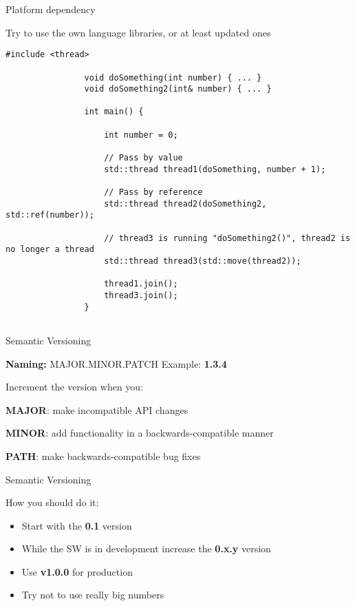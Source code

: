 \documentclass{beamer}
\newcommand{\normalSizeItem}[1] {
  \normalsize{\item #1}
}
\newcommand{\smallCite}[1]{
	\begin{small}
		\cite{#1}	
	\end{small}
}
\begin{document}
		\begin{frame}[fragile]{Platform dependency}	
			\begin{itemize}

				\normalSizeItem { Try to use the own language libraries, or at least updated ones }
				\begin{lstlisting}[basicstyle={\tiny\ttfamily}]
				#include <thread>
				
				void doSomething(int number) { ... }
				void doSomething2(int& number) { ... }
				
				int main() {
				
					int number = 0;
					
					// Pass by value
					std::thread thread1(doSomething, number + 1); 
					
					// Pass by reference
					std::thread thread2(doSomething2, std::ref(number)); 
					
					// thread3 is running "doSomething2()", thread2 is no longer a thread
					std::thread thread3(std::move(thread2)); 
					
					thread1.join();
					thread3.join();					
				}
				
				\end{lstlisting}
				
			\end{itemize}
		\end{frame}
		
		\begin{frame}[fragile]{Semantic Versioning \smallCite{semanticVersioning}}	
			
			\textbf{Naming:} MAJOR.MINOR.PATCH
			\newline\newline
			Example: \textbf{1.3.4}
		
			Increment the version when you:
			\begin{itemize}
				\normalSizeItem { \textbf{MAJOR}: make incompatible API changes}
				\normalSizeItem { \textbf{MINOR}: add functionality in a backwards-compatible manner}
				\normalSizeItem { \textbf{PATH}: make backwards-compatible bug fixes}
			\end{itemize}
		\end{frame}
		
		\begin{frame}[fragile]{Semantic Versioning}	
			
			How you should do it:
			\begin{itemize}
				\item Start with the \textbf{0.1} version
				\item While the SW is in development increase the \textbf{0.x.y }version
				\item Use \textbf{v1.0.0} for production
				\item Try not to use really big numbers
			\end{itemize}
		\end{frame}
		
\end{document}
